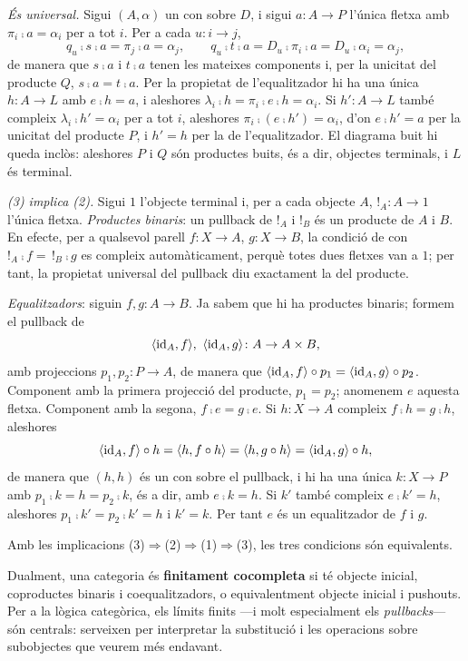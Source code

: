 \begin{prova}
\emph{És universal.} Sigui $(A,\alpha)$ un con sobre $D$, i sigui $a\colon A\to P$ l'única fletxa amb $\pi_i\comp a=\alpha_i$ per a tot $i$. Per a cada $u\colon i\to j$,
\[
q_u\comp s\comp a=\pi_j\comp a=\alpha_j,
\qquad
q_u\comp t\comp a=D_u\comp\pi_i\comp a=D_u\comp\alpha_i=\alpha_j,
\]
de manera que $s\comp a$ i $t\comp a$ tenen les mateixes components i, per la unicitat del producte $Q$, $s\comp a=t\comp a$. Per la propietat de l'equalitzador hi ha una única $h\colon A\to L$ amb $e\comp h=a$, i aleshores $\lambda_i\comp h=\pi_i\comp e\comp h=\alpha_i$. Si $h'\colon A\to L$ també compleix $\lambda_i\comp h'=\alpha_i$ per a tot $i$, aleshores $\pi_i\comp(e\comp h')=\alpha_i$, d'on $e\comp h'=a$ per la unicitat del producte $P$, i $h'=h$ per la de l'equalitzador. El diagrama buit hi queda inclòs: aleshores $P$ i $Q$ són productes buits, és a dir, objectes terminals, i $L$ és terminal.

\emph{(3) implica (2).} Sigui $1$ l'objecte terminal i, per a cada objecte $A$, $!_A\colon A\to 1$ l'única fletxa. \emph{Productes binaris}: un pullback de $!_A$ i $!_B$ és un producte de $A$ i $B$. En efecte, per a qualsevol parell $f\colon X\to A$, $g\colon X\to B$, la condició de con $!_A\comp f=\,!_B\comp g$ es compleix automàticament, perquè totes dues fletxes van a $1$; per tant, la propietat universal del pullback diu exactament la del producte.

\emph{Equalitzadors}: siguin $f,g\colon A\to B$. Ja sabem que hi ha productes binaris; formem el pullback de
\[
\langle\id_A,f\rangle,\ \langle\id_A,g\rangle\colon A\to A\times B,
\]
amb projeccions $p_1,p_2\colon P\to A$, de manera que $\langle\operatorname{id}_A,f\rangle\circ p_1=\langle\operatorname{id}_A,g\rangle\circ p_2$. Component amb la primera projecció del producte, $p_1=p_2$; anomenem $e$ aquesta fletxa. Component amb la segona, $f\comp e=g\comp e$. Si $h\colon X\to A$ compleix $f\comp h=g\comp h$, aleshores
\[
\langle\operatorname{id}_A,f\rangle\circ h=\langle h,f\circ h\rangle=\langle h,g\circ h\rangle=\langle\operatorname{id}_A,g\rangle\circ h,
\]
de manera que $(h,h)$ és un con sobre el pullback, i hi ha una única $k\colon X\to P$ amb $p_1\comp k=h=p_2\comp k$, és a dir, amb $e\comp k=h$. Si $k'$ també compleix $e\comp k'=h$, aleshores $p_1\comp k'=p_2\comp k'=h$ i $k'=k$. Per tant $e$ és un equalitzador de $f$ i $g$.

Amb les implicacions (3)$\Rightarrow$(2)$\Rightarrow$(1)$\Rightarrow$(3), les tres condicions són equivalents.
\end{prova}

\begin{observacio}
Dualment, una categoria és \textbf{finitament cocompleta} si té objecte inicial, coproductes binaris i coequalitzadors, o equivalentment objecte inicial i pushouts. Per a la lògica categòrica, els límits finits ---i molt especialment els \emph{pullbacks}--- són centrals: serveixen per interpretar la substitució i les operacions sobre subobjectes que veurem més endavant.
\end{observacio}

